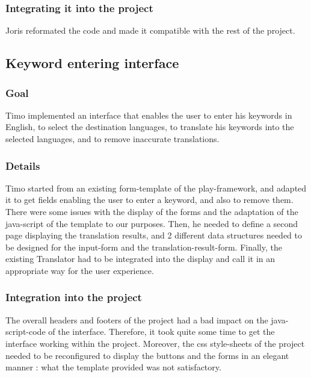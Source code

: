 \subsubsection{Integrating it into the project}

Joris reformated the code and made it compatible with the rest of the project.

\subsection{Keyword entering interface}

\subsubsection{Goal}
Timo implemented an interface that enables the user to enter his keywords in English, to select the destination languages, to translate his keywords into the selected languages, and to remove inaccurate translations.

\subsubsection{Details}
Timo started from an existing form-template of the play-framework, and adapted it to get fields enabling the user to enter a keyword, and also to remove them. There were some issues with the display of the forms and the adaptation of the java-script of the template to our purposes. Then, he needed to define a second page displaying the translation results, and 2 different data structures needed to be designed for the input-form and the translation-result-form. Finally, the existing Translator had to be integrated into the display and call it in an appropriate way for the user experience.

\subsubsection{Integration into the project}
The overall headers and footers of the project had a bad impact on the java-script-code of the interface. Therefore, it took quite some time to get the interface working within the project. Moreover, the css style-sheets of the project needed to be reconfigured to display the buttons and the forms in an elegant manner : what the template provided was not satisfactory.




